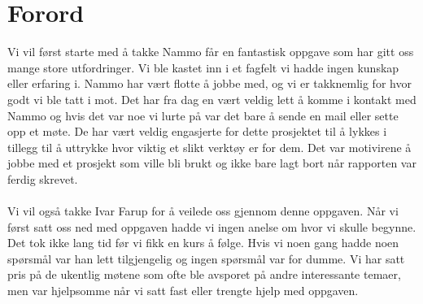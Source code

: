 \chapter*{Forord} %
\label{chap:preface}

Vi vil først starte med å takke Nammo får en fantastisk oppgave som har gitt oss mange store utfordringer. Vi ble kastet inn i et fagfelt vi hadde ingen kunskap eller erfaring i.  Nammo har vært flotte å jobbe med, og vi er takknemlig for hvor godt vi ble tatt i mot. Det har fra dag en vært veldig lett å komme i kontakt med Nammo og hvis det var noe vi lurte på var det bare å sende en mail eller sette opp et møte. De har vært veldig engasjerte for dette prosjektet til å lykkes i tillegg til å uttrykke hvor viktig et slikt verktøy er for dem. Det var motivirene å jobbe med et prosjekt som ville bli brukt og ikke bare lagt bort når rapporten var ferdig skrevet. \\ \\
Vi vil også takke Ivar Farup for å veilede oss gjennom denne oppgaven. Når vi først satt oss ned med oppgaven hadde vi ingen anelse om hvor vi skulle begynne. Det tok ikke lang tid før vi fikk en kurs å følge. Hvis vi  noen gang hadde noen spørsmål var han lett tilgjengelig og ingen spørsmål var for dumme. Vi har satt pris på de ukentlig møtene som ofte ble avsporet på andre interessante temaer, men var hjelpsomme når vi satt fast eller trengte hjelp med oppgaven.\\ \\


 